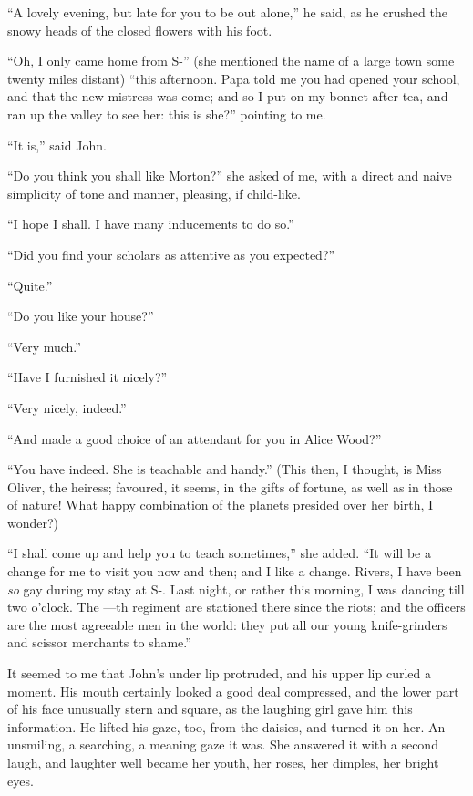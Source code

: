 \enquote{A lovely evening, but late for you to be out alone,} he said,
as he crushed the snowy heads of the closed flowers with his foot.

\enquote{Oh, I only came home from S-} (she mentioned the name of a
large town some twenty miles distant) \enquote{this afternoon. Papa
	told me you had opened your school, and that the new mistress was come;
	and so I put on my bonnet after tea, and ran up the valley to see her:
	this is she?} pointing to me.

\enquote{It is,} said \St{} John.

\enquote{Do you think you shall like Morton?} she asked of me, with a
direct and naive simplicity of tone and manner, pleasing, if child-like.

\enquote{I hope I shall. I have many inducements to do so.}

\enquote{Did you find your scholars as attentive as you expected?}

\enquote{Quite.}

\enquote{Do you like your house?}

\enquote{Very much.}

\enquote{Have I furnished it nicely?}

\enquote{Very nicely, indeed.}

\enquote{And made a good choice of an attendant for you in Alice Wood?}

\enquote{You have indeed. She is teachable and handy.} (This then, I
thought, is Miss Oliver, the heiress; favoured, it seems, in the gifts
of fortune, as well as in those of nature! What happy combination of
the planets presided over her birth, I wonder?)

\enquote{I shall come up and help you to teach sometimes,} she added.
\enquote{It will be a change for me to visit you now and then; and I like a
	change. \Mr{} Rivers, I have been \emph{so} gay during my stay at S-.
	Last night, or rather this morning, I was dancing till two o'clock. The
	---th regiment are stationed there since the riots; and the officers are
	the most agreeable men in the world: they put all our young
	knife-grinders and scissor merchants to shame.}

It seemed to me that \Mr{} \St{} John's under lip protruded, and his upper
lip curled a moment. His mouth certainly looked a good deal compressed,
and the lower part of his face unusually stern and square, as the
laughing girl gave him this information. He lifted his gaze, too, from
the daisies, and turned it on her. An unsmiling, a searching, a meaning
gaze it was. She answered it with a second laugh, and laughter well
became her youth, her roses, her dimples, her bright eyes.

